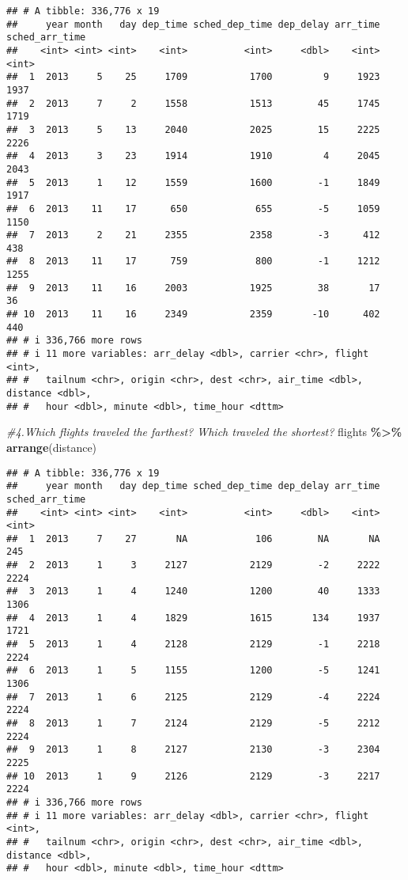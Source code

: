 \documentclass[
]{article}
\newenvironment{Shaded}{\begin{snugshade}}{\end{snugshade}}
\newcommand{\CommentTok}[1]{\textcolor[rgb]{0.56,0.35,0.01}{\textit{#1}}}
\newcommand{\FunctionTok}[1]{\textcolor[rgb]{0.13,0.29,0.53}{\textbf{#1}}}
\newcommand{\NormalTok}[1]{#1}
\newcommand{\SpecialCharTok}[1]{\textcolor[rgb]{0.81,0.36,0.00}{\textbf{#1}}}
\begin{document}
\begin{verbatim}
## # A tibble: 336,776 x 19
##     year month   day dep_time sched_dep_time dep_delay arr_time sched_arr_time
##    <int> <int> <int>    <int>          <int>     <dbl>    <int>          <int>
##  1  2013     5    25     1709           1700         9     1923           1937
##  2  2013     7     2     1558           1513        45     1745           1719
##  3  2013     5    13     2040           2025        15     2225           2226
##  4  2013     3    23     1914           1910         4     2045           2043
##  5  2013     1    12     1559           1600        -1     1849           1917
##  6  2013    11    17      650            655        -5     1059           1150
##  7  2013     2    21     2355           2358        -3      412            438
##  8  2013    11    17      759            800        -1     1212           1255
##  9  2013    11    16     2003           1925        38       17             36
## 10  2013    11    16     2349           2359       -10      402            440
## # i 336,766 more rows
## # i 11 more variables: arr_delay <dbl>, carrier <chr>, flight <int>,
## #   tailnum <chr>, origin <chr>, dest <chr>, air_time <dbl>, distance <dbl>,
## #   hour <dbl>, minute <dbl>, time_hour <dttm>
\end{verbatim}

\begin{Shaded}
\begin{Highlighting}[]
\CommentTok{\#4.Which flights traveled the farthest? Which traveled the shortest?}
\NormalTok{flights }\SpecialCharTok{\%\textgreater{}\%} 
    \FunctionTok{arrange}\NormalTok{(distance)}
\end{Highlighting}
\end{Shaded}

\begin{verbatim}
## # A tibble: 336,776 x 19
##     year month   day dep_time sched_dep_time dep_delay arr_time sched_arr_time
##    <int> <int> <int>    <int>          <int>     <dbl>    <int>          <int>
##  1  2013     7    27       NA            106        NA       NA            245
##  2  2013     1     3     2127           2129        -2     2222           2224
##  3  2013     1     4     1240           1200        40     1333           1306
##  4  2013     1     4     1829           1615       134     1937           1721
##  5  2013     1     4     2128           2129        -1     2218           2224
##  6  2013     1     5     1155           1200        -5     1241           1306
##  7  2013     1     6     2125           2129        -4     2224           2224
##  8  2013     1     7     2124           2129        -5     2212           2224
##  9  2013     1     8     2127           2130        -3     2304           2225
## 10  2013     1     9     2126           2129        -3     2217           2224
## # i 336,766 more rows
## # i 11 more variables: arr_delay <dbl>, carrier <chr>, flight <int>,
## #   tailnum <chr>, origin <chr>, dest <chr>, air_time <dbl>, distance <dbl>,
## #   hour <dbl>, minute <dbl>, time_hour <dttm>
\end{verbatim}
\end{document}
